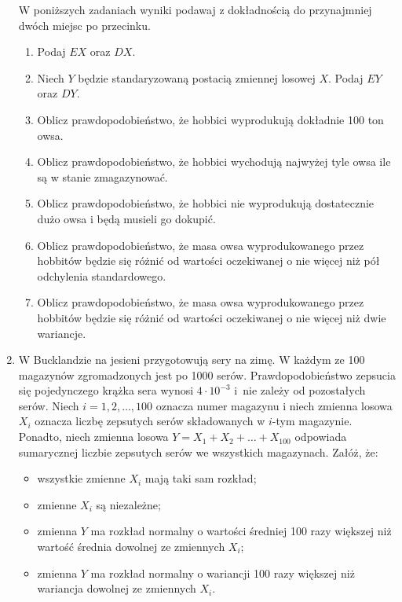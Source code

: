 \documentclass[twoside]{mwart}
\newcommand{\ans}[1]{}
\newenvironment{ansenv}{\comment}{\endcomment}
\newenvironment{ansenv}{\paragraph{Odpowiedź:}}{}
\newcommand{\ans}[1]{\begin{ansenv}#1\end{ansenv}}
\begin{document}
\begin{enumerate}
W poniższych zadaniach wyniki podawaj z dokładnością do przynajmniej dwóch miejsc po przecinku.
\begin{enumerate}
\item Podaj $EX$ oraz $DX$.
\ans{$EX=100 \quad DX=20$}
\item Niech $Y$ będzie standaryzowaną postacią zmiennej losowej $X$. Podaj $EY$ oraz $DY$.
\ans{$EY=0 \quad DY=1$}
\item Oblicz prawdopodobieństwo, że hobbici wyprodukują dokładnie 100 ton owsa.
\ans{$P(X=100)=0$, bo dla zmiennych losowych typu ciągłego prawdopodobieństwo w punkcie jest zawsze równe 0}
\item Oblicz prawdopodobieństwo, że hobbici wychodują najwyżej tyle owsa ile są w stanie zmagazynować.
\ans{$P(X<130)=F_X(130)=F_Y(1{,}5)=0{,}933$}
\item Oblicz prawdopodobieństwo, że hobbici nie wyprodukują dostatecznie dużo owsa i będą musieli go dokupić.
\ans{$P(X<85)=F_X(85)=F_Y(-0{,}75)=1-F_Y(0{,}75)=1-0{,}773=0{,}227$}
\item Oblicz prawdopodobieństwo, że masa owsa wyprodukowanego przez hobbitów będzie się różnić od wartości oczekiwanej o nie więcej niż pół odchylenia standardowego.
\ans{\begin{gather*}
	P\left(\left|X-EX\right|\leq \frac{DX}{2}\right) = P(\left|X-100\right|\leq 10) = P(90\leq X\leq 110) = F_X(110)-F_X(90) =\\
	F_Y(0{,}5)-F_Y(-0{,}5) = F_Y(0{,}5)-\left(1-F_Y(0{,}5)\right) = 2F_Y(0{,}5)-1 = 2\cdot0{,}6915-1=0{,}38
	\end{gather*}
}
\item Oblicz prawdopodobieństwo, że masa owsa wyprodukowanego przez hobbitów będzie się różnić od wartości oczekiwanej o nie więcej niż dwie wariancje.
\ans{\begin{gather*}
	P(\left|X-EX\right|<2D^2X) = P(\left|X-100\right|<800) = P(-700<X<900) = F_X(900)-F_X(-700)=2F_Y(40)-1=1
	\end{gather*}	
}
\end{enumerate}

\item W Bucklandzie na jesieni przygotowują sery na zimę. W każdym ze 100 magazynów
zgromadzonych jest po 1000 serów. Prawdopodobieństwo zepsucia się pojedynczego
krążka sera wynosi $4\cdot 10^{-3}$ i~nie zależy od pozostałych serów. Niech
$i=1,2,\ldots,100$ oznacza numer magazynu i niech zmienna losowa $X_i$ oznacza
liczbę zepsutych serów składowanych w $i$-tym magazynie. Ponadto, niech zmienna
losowa $Y=X_1+X_2+\ldots+X_{100}$ odpowiada sumarycznej liczbie zepsutych serów
we wszystkich magazynach. Załóż, że:
\begin{itemize}
\item wszystkie zmienne $X_i$ mają taki sam rozkład;
\item zmienne $X_i$ są niezależne;
\item zmienna $Y$ ma rozkład normalny o wartości średniej 100 razy większej niż wartość średnia dowolnej ze zmiennych $X_i$;
\item zmienna $Y$ ma rozkład normalny o wariancji 100 razy większej niż wariancja dowolnej ze zmiennych $X_i$.
\end{itemize}


\end{enumerate}
\end{document}
